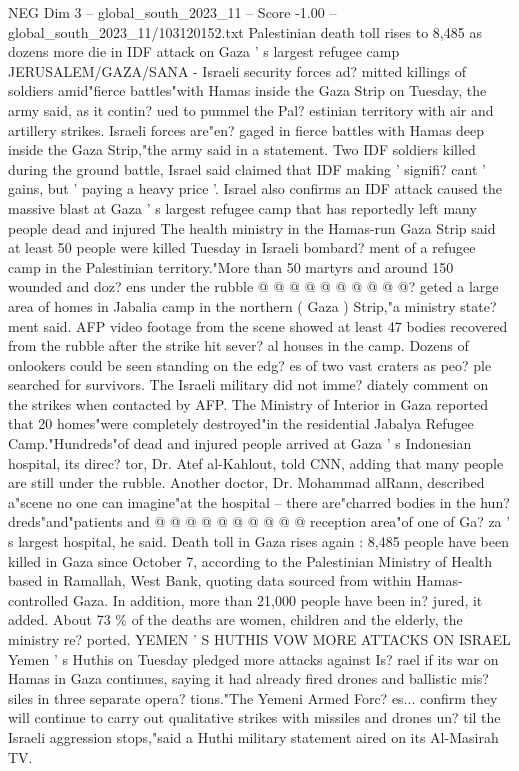 \begin{textsample}{NEG Dim 3 – global\_south\_2023\_11 – Score -1.00 – global\_south\_2023\_11/103120152.txt}  \label{ex:f3_neg_106}
Palestinian death toll rises to 8,485 as dozens more die in IDF attack on Gaza ' s largest refugee camp JERUSALEM/GAZA/SANA - Israeli security forces ad? mitted killings of soldiers amid"fierce battles"with Hamas inside the Gaza Strip on Tuesday, the army said, as it contin? ued to pummel the Pal? estinian territory with air and artillery strikes.
Israeli forces are"en? gaged in fierce battles with Hamas deep inside the Gaza Strip,"the army said in a statement.
Two IDF soldiers killed during the ground battle, Israel said claimed that IDF making ' signifi? cant ' gains, but ' paying a heavy price '.
Israel also confirms an IDF attack caused the massive blast at Gaza ' s largest refugee camp that has reportedly left many people dead and injured The health ministry in the Hamas-run Gaza Strip said at least 50 people were killed Tuesday in Israeli bombard? ment of a refugee camp in the Palestinian territory."More than 50 martyrs and around 150 wounded and doz? ens under the rubble @ @ @ @ @ @ @ @ @ @? geted a large area of homes in Jabalia camp in the northern ( Gaza ) Strip,"a ministry state? ment said.
AFP video footage from the scene showed at least 47 bodies recovered from the rubble after the strike hit sever? al houses in the camp.
Dozens of onlookers could be seen standing on the edg? es of two vast craters as peo? ple searched for survivors.
The Israeli military did not imme? diately comment on the strikes when contacted by AFP.
The Ministry of Interior in Gaza reported that 20 homes"were completely destroyed"in the residential Jabalya Refugee Camp."Hundreds"of dead and injured people arrived at Gaza ' s Indonesian hospital, its direc? tor, Dr.
Atef al-Kahlout, told CNN, adding that many people are still under the rubble.
Another doctor, Dr.
Mohammad alRann, described a"scene no one can imagine"at the hospital -- there are"charred bodies in the hun? dreds"and"patients and @ @ @ @ @ @ @ @ @ @ reception area"of one of Ga? za ' s largest hospital, he said.
Death toll in Gaza rises again : 8,485 people have been killed in Gaza since October 7, according to the Palestinian Ministry of Health based in Ramallah, West Bank, quoting data sourced from within Hamas-controlled Gaza.
In addition, more than 21,000 people have been in? jured, it added.
About 73 \% of the deaths are women, children and the elderly, the ministry re? ported.
YEMEN ' S HUTHIS VOW MORE ATTACKS ON ISRAEL Yemen ' s Huthis on Tuesday pledged more attacks against Is? rael if its war on Hamas in Gaza continues, saying it had already fired drones and ballistic mis? siles in three separate opera? tions."The Yemeni Armed Forc? es... confirm they will continue to carry out qualitative strikes with missiles and drones un? til the Israeli aggression stops,"said a Huthi military statement aired on its Al-Masirah TV.

\end{textsample}
